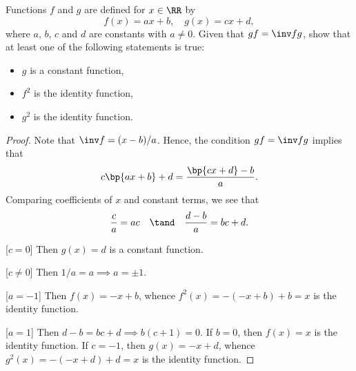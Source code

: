 \begin{problem}
    Functions $f$ and $g$ are defined for $x \in \RR$ by \[f(x) = ax + b, \quad g(x) = cx + d,\] where $a$, $b$, $c$ and $d$ are constants with $a \neq 0$. Given that $gf = \inv f g$, show that at least one of the following statements is true:
    \begin{itemize}
        \item $g$ is a constant function,
        \item $f^2$ is the identity function,
        \item $g^2$ is the identity function.
    \end{itemize}
\end{problem}
\begin{proof}
    Note that $\inv f = (x-b)/a$. Hence, the condition $gf = \inv fg$ implies that \[c\bp{ax + b} + d = \frac{\bp{cx + d} -b}{a}.\] Comparing coefficients of $x$ and constant terms, we see that \[\frac{c}{a} = ac \quad \tand \quad \frac{d-b}{a} = bc + d.\]

    [$c = 0$] Then $g(x) = d$ is a constant function.

    [$c \neq 0$] Then $1/a = a \implies a = \pm 1$.

    [$a = -1$] Then $f(x) = -x + b$, whence $f^2(x) = -(-x+b)+b = x$ is the identity function.

    [$a = 1$] Then $d - b = bc + d \implies b(c+1) = 0$. If $b = 0$, then $f(x) = x$ is the identity function. If $c = -1$, then $g(x) = -x+d$, whence $g^2(x) = -(-x+d)+d = x$ is the identity function.
\end{proof}

